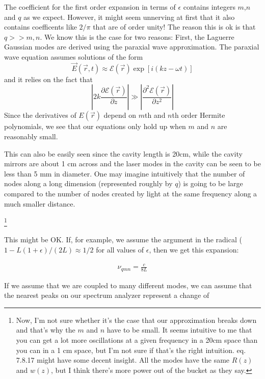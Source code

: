 The coefficient for the first order expansion in terms of $\epsilon$ contains integers $m$,$n$ and $q$ as we expect. 
However, it might seem unnerving at first that it also contains coefficents like $2/\pi$ that are of order unity! The reason this is ok is that $q>>m,n$. We know this is the case for two reasons: First, the Laguerre Gaussian modes are derived using the paraxial wave approximation. The paraxial wave equation assumes solutions of the form
\begin{equation}
\vec{E}(\vec{r},t)\approx \mathcal{E}(\vec{r})\exp[i(kz-\omega t)]
\end{equation}
and it relies on the fact that 
\begin{equation}
\left|2k\frac{\partial \mathcal{E}(\vec{r})}{\partial z}\right|\gg\left|\frac{\partial^2\mathcal{E}(\vec{r})}{\partial z^2}\right|
\end{equation}
Since the derivatives of $E(\vec{r})$ depend on $m$th and $n$th order Hermite polynomials, we see that our equations only hold up when $m$ and $n$ are reasonably small. 

This can also be easily seen since the cavity length is 20cm, while the cavity mirrors are about 1 cm across and the laser modes in the cavity can be seen to be less than 5 mm in diameter. One may imagine intuitively that the number of nodes along a long dimension (represented roughly by $q$) is going to be large compared to the number of nodes created by light at the same frequency along a much smaller distance. 

\footnote{Now, I'm not sure whether it's the case that our approximation breaks down and that's why the $m$ and $n$ have to be small. It seems intuitive to me that you can get a lot more oscillations at a given frequency in a 20cm space than you can in a 1 cm space, but I'm not sure if that's the right intuition.\cite{lasersMilonniEberly} eq. 7.8.17 might have some decent insight. All the modes have the same $R(z)$ and $w(z)$, but I think there's more power out of the bucket as they say.  }

This might be OK. If, for example, we assume the argument in the radical ($1-L(1+\epsilon)/(2L)\approx 1/2$ for all values of $\epsilon$, then we get this expansion: 

\begin{align}
\nu_{qmn}=\frac{c}{8L}
\end{align}



If we assume that we are coupled to many different modes, we can assume that the nearest peaks on our spectrum analyzer represent a change of 

